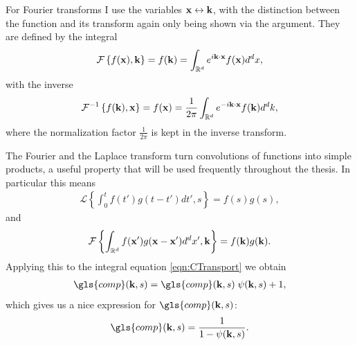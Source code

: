 For Fourier transforms I use the variables $\mathbf{ x } \leftrightarrow \mathbf{ k }$, with the distinction between the function and its transform again only being shown via the argument. They are defined by the integral 
%
\begin{align}
\mathcal{F} \left\{ f(\mathbf{ x }), \mathbf{ k } \right\} = f(\mathbf{ k }) = \int_{\mathbb{R}^{d}} e^{i\mathbf{ k } \cdot \mathbf{ x }} f(\mathbf{ x }) d^{d}x ,
\end{align}
%
with the inverse 
%
\begin{align}
\mathcal{F}^{-1} \left\{ f(\mathbf{ k }), \mathbf{ x } \right\} = f(\mathbf{ x }) = \frac{1}{2 \pi} \int_{\mathbb{R}^{d}} e^{-i\mathbf{ k } \cdot \mathbf{ x }} f(\mathbf{ k }) d^{d}k ,
\end{align}
%
where the normalization factor $\frac{1}{2 \pi}$ is kept in the inverse transform.

The Fourier and the Laplace transform turn convolutions of functions into simple products, a useful property that will be used frequently throughout the thesis. In particular this means
%
\begin{align}
\mathcal{L} \left\{ \int_{0}^{t} f(t') g(t-t') dt', s \right\} = f(s) g(s)  \label{eqn:LConvolution} ,
\end{align}
%
and 
%
\begin{align}
\mathcal{F} \left\{ \int_{\mathbb{R}^{d}} f(\mathbf{ x }') g(\mathbf{ x } - \mathbf{ x }') d^{d}x' , \mathbf{ k } \right\} = f(\mathbf{ k }) g(\mathbf{ k })  \label{eqn:FConvolution} .
\end{align}
%
Applying this to the integral equation \ref{eqn:CTransport} we obtain 
%
\begin{align}
\gls{comp}(\ve{k},s) =  \gls{comp}(\ve{k},s)  \; \psi(\ve{k},s) + 1 ,
\end{align}
%
which gives us a nice expression for $\gls{comp}(\ve{k},s)$: 
%
\begin{align}
\gls{comp}(\ve{k},s) = \frac{1}{1 - \psi(\ve{k},s)} \label{eqn:CFourierLaplace} .
\end{align}

